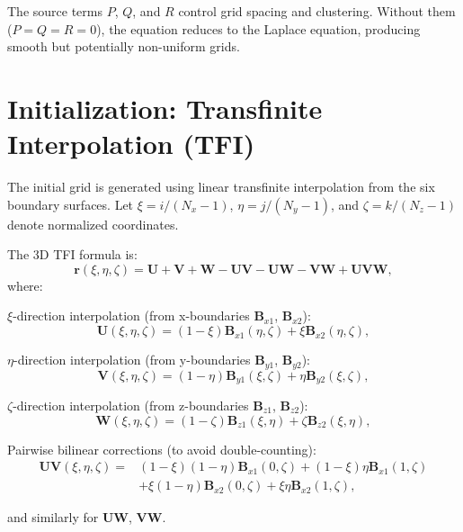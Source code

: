 \documentclass[11pt,a4paper]{report}
\newcommand{\rvec}{\bm{r}}
\begin{document}
The source terms $P$, $Q$, and $R$ control grid spacing and clustering. Without them ($P = Q = R = 0$), the equation reduces to the Laplace equation, producing smooth but potentially non-uniform grids.

\section{Initialization: Transfinite Interpolation (TFI)}

The initial grid is generated using linear transfinite interpolation from the six boundary surfaces. Let $\xi = i/(N_x-1)$, $\eta = j/(N_y-1)$, and $\zeta = k/(N_z-1)$ denote normalized coordinates.

The 3D TFI formula is:
\begin{equation}
    \rvec(\xi, \eta, \zeta) = \bm{U} + \bm{V} + \bm{W} - \bm{UV} - \bm{UW} - \bm{VW} + \bm{UVW},
\end{equation}
where:

$\xi$-direction interpolation (from x-boundaries $\bm{B}_{x1}$, $\bm{B}_{x2}$):
\begin{equation}
    \bm{U}(\xi, \eta, \zeta) = (1-\xi) \bm{B}_{x1}(\eta, \zeta) + \xi \bm{B}_{x2}(\eta, \zeta),
\end{equation}

$\eta$-direction interpolation (from y-boundaries $\bm{B}_{y1}$, $\bm{B}_{y2}$):
\begin{equation}
    \bm{V}(\xi, \eta, \zeta) = (1-\eta) \bm{B}_{y1}(\xi, \zeta) + \eta \bm{B}_{y2}(\xi, \zeta),
\end{equation}

$\zeta$-direction interpolation (from z-boundaries $\bm{B}_{z1}$, $\bm{B}_{z2}$):
\begin{equation}
    \bm{W}(\xi, \eta, \zeta) = (1-\zeta) \bm{B}_{z1}(\xi, \eta) + \zeta \bm{B}_{z2}(\xi, \eta),
\end{equation}

Pairwise bilinear corrections (to avoid double-counting):
\begin{equation}
\begin{split}
    \bm{UV}(\xi, \eta, \zeta) = & (1-\xi)(1-\eta)\bm{B}_{x1}(0,\zeta) + (1-\xi)\eta\bm{B}_{x1}(1,\zeta) \\
    & + \xi(1-\eta)\bm{B}_{x2}(0,\zeta) + \xi\eta\bm{B}_{x2}(1,\zeta),
\end{split}
\end{equation}

and similarly for $\bm{UW}$, $\bm{VW}$.
\end{document}
